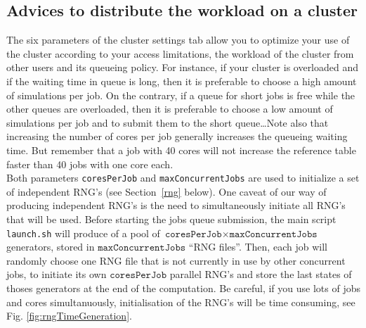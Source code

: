 \subsection{Advices to distribute the workload on a cluster}

\label{sub:advices}

The six parameters of the cluster settings tab allow you to optimize
your use of the cluster according to your access limitations, the
workload of the cluster from other users and its queueing policy.
For instance, if your cluster is overloaded and if the waiting time
in queue is long, then it is preferable to choose a high amount of
simulations per job. On the contrary, if a queue for short jobs is
free while the other queues are overloaded, then it is preferable
to choose a low amount of simulations per job and to submit them to
the short queue\ldots{}Note also that increasing the number of cores
per job generally increases the queueing waiting time. But remember
that a job with 40 cores will not increase the reference table faster
than 40 jobs with one core each. \\


Both parameters \texttt{coresPerJob} and \texttt{maxConcurrentJobs}
are used to initialize a set of independent RNG's (see Section~\ref{rng}
below). One caveat of our way of producing independent RNG's is the
need to simultaneously initiate all RNG's that will be used. Before
starting the jobs queue submission, the main script \texttt{launch.sh}
will produce of a pool of $\texttt{coresPerJob}\times\texttt{maxConcurrentJobs}$
generators, stored in $\texttt{maxConcurrentJobs}$ ``RNG files''.
Then, each job will randomly choose one RNG file that is not currently
in use by other concurrent jobs, to initiate its own $\texttt{coresPerJob}$
parallel RNG's and store the last states of thoses generators at the
end of the computation. Be careful, if you use lots of jobs and cores
simultanuously, initialisation of the RNG's will be time consuming,
see Fig. \ref{fig:rngTimeGeneration}.

